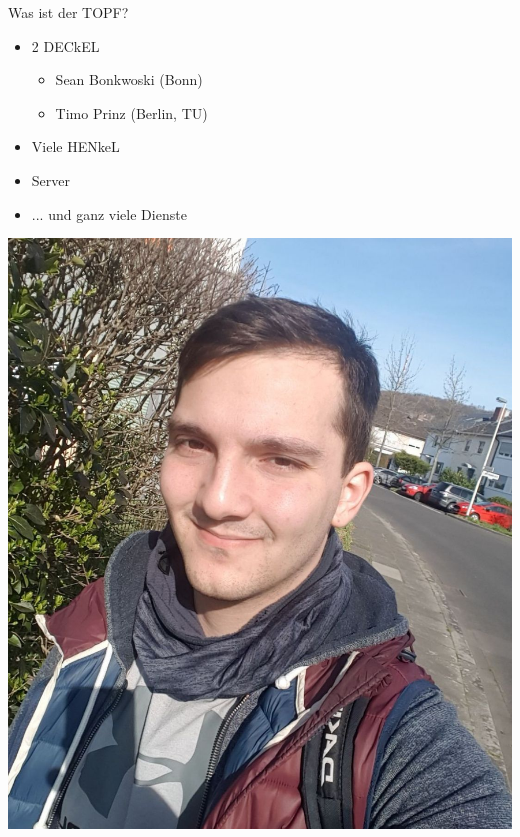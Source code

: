 \documentclass[compress, aspectratio=169]{beamer}
\begin{document}
\begin{frame}{Was ist der TOPF?}
  \begin{minipage}{.5\textwidth}
    \begin{itemize}
      \item 2 DECkEL \footnotemark[1]
      \begin{itemize}
        \item Sean Bonkwoski (Bonn)
        \item Timo Prinz (Berlin, TU)
      \end{itemize}
      \item Viele HENkeL\footnotemark[2]\footnotemark[3]
      \item Server
      \item ... und ganz viele Dienste
    \end{itemize}
  \end{minipage}
  \hfill
  \begin{minipage}{.48\textwidth}
    \begin{minipage}[c]{.5\textwidth}
      \includegraphics[height=.4\textheight]{sean.jpg}
    \end{minipage}

\end{minipage}
\end{frame}
\end{document}
